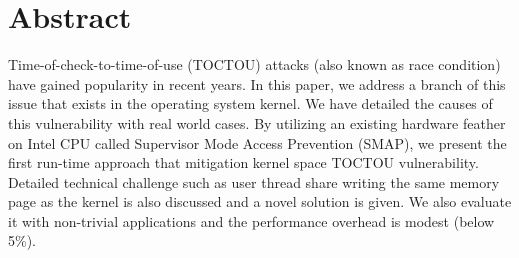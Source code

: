 \section{Abstract}

Time-of-check-to-time-of-use (TOCTOU) attacks (also known as race condition) have gained popularity in recent years. In this paper, we address a branch of this issue that exists in the operating system kernel. We have detailed the causes of this vulnerability with real world cases. By utilizing an existing hardware feather on Intel CPU called Supervisor Mode Access Prevention (SMAP),  we present the first run-time approach that mitigation kernel space TOCTOU vulnerability. Detailed technical challenge such as user thread share writing the same memory page as the kernel is also discussed and a novel solution is given. We also evaluate it with non-trivial applications and the performance overhead is modest (below 5\%).  

